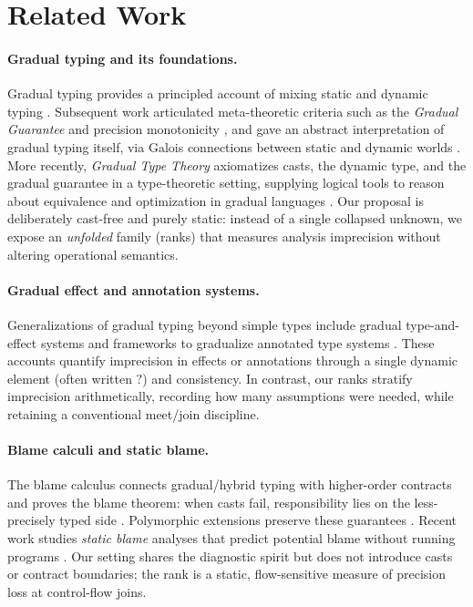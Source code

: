 \section{Related Work}
\label{sec:related}

\paragraph{Gradual typing and its foundations.}
Gradual typing provides a principled account of mixing static and dynamic typing \cite{SiekTaha2006}. Subsequent work articulated meta-theoretic criteria such as the \emph{Gradual Guarantee} and precision monotonicity \cite{SiekGarciaTaha2015}, and gave an abstract interpretation of gradual typing itself, via Galois connections between static and dynamic worlds \cite{GarciaClarkTanter2016}. More recently, \emph{Gradual Type Theory} axiomatizes casts, the dynamic type, and the gradual guarantee in a type-theoretic setting, supplying logical tools to reason about equivalence and optimization in gradual languages \cite{NewLicataAhmed2021}. Our proposal is deliberately cast-free and purely static: instead of a single collapsed unknown, we expose an \emph{unfolded} family (ranks) that measures analysis imprecision without altering operational semantics.

\paragraph{Gradual effect and annotation systems.}
Generalizations of gradual typing beyond simple types include gradual type-and-effect systems \cite{BanadosSchwerterGarciaTanter2016} and frameworks to gradualize annotated type systems \cite{ThiemannFennell2014}. These accounts quantify imprecision in effects or annotations through a single dynamic element (often written $?$) and consistency. In contrast, our ranks stratify imprecision arithmetically, recording how many assumptions were needed, while retaining a conventional meet/join discipline.

\paragraph{Blame calculi and static blame.}
The blame calculus connects gradual/hybrid typing with higher-order contracts and proves the blame theorem: when casts fail, responsibility lies on the less-precisely typed side \cite{WadlerFindler2009}. Polymorphic extensions preserve these guarantees \cite{AhmedFindlerSiekWadler2011}. Recent work studies \emph{static blame} analyses that predict potential blame without running programs \cite{SuCulpepper2024}. Our setting shares the diagnostic spirit but does not introduce casts or contract boundaries; the rank is a static, flow-sensitive measure of precision loss at control-flow joins.

